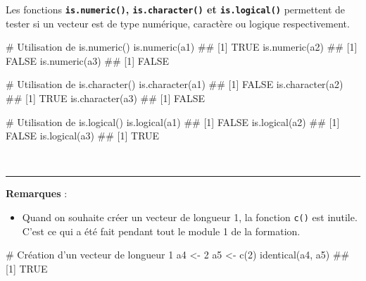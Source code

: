 \documentclass[12pt,twosided, notitlepage]{book}
\newenvironment{Shaded}{}{}
\newcommand{\KeywordTok}[1]{\textcolor[rgb]{0.00,0.00,1.00}{{#1}}}
\newcommand{\DecValTok}[1]{{#1}}
\newcommand{\StringTok}[1]{\textcolor[rgb]{0.00,0.50,0.50}{{#1}}}
\newcommand{\CommentTok}[1]{\textcolor[rgb]{0.00,0.50,0.00}{{#1}}}
\newcommand{\NormalTok}[1]{{#1}}
\providecommand{\tightlist}{%
  \setlength{\itemsep}{0pt}\setlength{\parskip}{0pt}}
\renewenvironment{Shaded}{\begin{snugshade}}{\end{snugshade}}
\begin{document}
Les fonctions \textbf{\texttt{is.numeric()}, \texttt{is.character()} et
\texttt{is.logical()}}
permettent de tester si un vecteur est de type numérique, caractère ou
logique respectivement.

\begin{Shaded}
\begin{Highlighting}[]
\CommentTok{# Utilisation de is.numeric()}
\KeywordTok{is.numeric}\NormalTok{(a1)}
  \NormalTok{## [1] TRUE}
\KeywordTok{is.numeric}\NormalTok{(a2)}
  \NormalTok{## [1] FALSE}
\KeywordTok{is.numeric}\NormalTok{(a3)}
  \NormalTok{## [1] FALSE}

\CommentTok{# Utilisation de is.character()}
\KeywordTok{is.character}\NormalTok{(a1)}
  \NormalTok{## [1] FALSE}
\KeywordTok{is.character}\NormalTok{(a2)}
  \NormalTok{## [1] TRUE}
\KeywordTok{is.character}\NormalTok{(a3)}
  \NormalTok{## [1] FALSE}

\CommentTok{# Utilisation de is.logical()}
\KeywordTok{is.logical}\NormalTok{(a1)}
  \NormalTok{## [1] FALSE}
\KeywordTok{is.logical}\NormalTok{(a2)}
  \NormalTok{## [1] FALSE}
\KeywordTok{is.logical}\NormalTok{(a3)}
  \NormalTok{## [1] TRUE}
\end{Highlighting}
\end{Shaded}

~

\begin{center}\rule{0.5\linewidth}{\linethickness}\end{center}

\textbf{Remarques} :

\begin{itemize}
\tightlist
\item
  Quand on souhaite créer un vecteur de longueur 1, la fonction
  \texttt{c()} est inutile. C'est ce qui a été fait pendant tout le
  module 1 de la formation.
\end{itemize}

\begin{Shaded}
\begin{Highlighting}[]
\CommentTok{# Création d'un vecteur de longueur 1}
\NormalTok{a4 <-}\StringTok{ }\DecValTok{2}
\NormalTok{a5 <-}\StringTok{ }\KeywordTok{c}\NormalTok{(}\DecValTok{2}\NormalTok{)}
\KeywordTok{identical}\NormalTok{(a4, a5)}
  \NormalTok{## [1] TRUE}
\end{Highlighting}
\end{Shaded}
\end{document}

